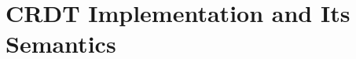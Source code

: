 
\section{CRDT Implementation and Its Semantics}
\label{sec:CRDT implementation and its semantics} 



